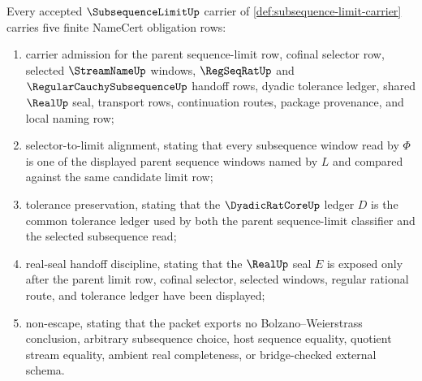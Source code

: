 \begin{theorem}\label{thm:subsequence-limit-namecert-obligations}
Every accepted $\SubsequenceLimitUp$ carrier of \autoref{def:subsequence-limit-carrier} carries five finite NameCert obligation rows:
\begin{enumerate}
\item carrier admission for the parent sequence-limit row, cofinal selector row, selected $\StreamNameUp$ windows, $\RegSeqRatUp$ and $\RegularCauchySubsequenceUp$ handoff rows, dyadic tolerance ledger, shared $\RealUp$ seal, transport rows, continuation routes, package provenance, and local naming row;
\item selector-to-limit alignment, stating that every subsequence window read by $\Phi$ is one of the displayed parent sequence windows named by $L$ and compared against the same candidate limit row;
\item tolerance preservation, stating that the $\DyadicRatCoreUp$ ledger $D$ is the common tolerance ledger used by both the parent sequence-limit classifier and the selected subsequence read;
\item real-seal handoff discipline, stating that the $\RealUp$ seal $E$ is exposed only after the parent limit row, cofinal selector, selected windows, regular rational route, and tolerance ledger have been displayed;
\item non-escape, stating that the packet exports no Bolzano--Weierstrass conclusion, arbitrary subsequence choice, host sequence equality, quotient stream equality, ambient real completeness, or bridge-checked external schema.
\end{enumerate}
\end{theorem}
